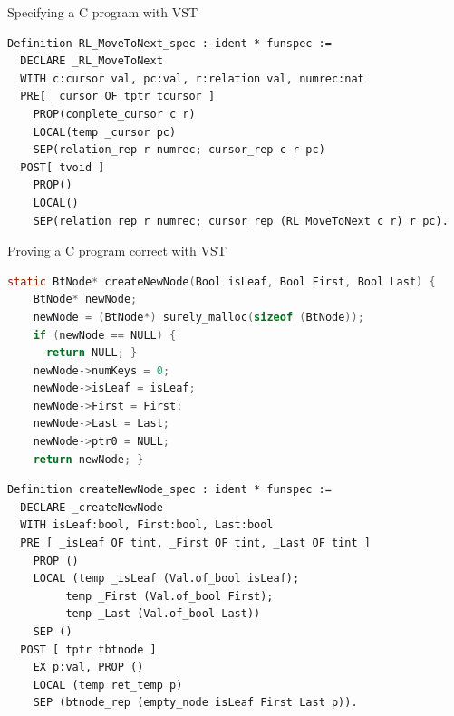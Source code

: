 \documentclass[page number,usenames,dvipsnames]{beamer}
\def\spec#1{{\color{spec}\textbf{#1}}}
\def\prog#1{{\color{prog}\textbf{#1}}}
\begin{document}
\begin{frame}[fragile]{Specifying a C program with VST}
 \begin{lstlisting}[language=Coq,basicstyle=\small]
Definition RL_MoveToNext_spec : ident * funspec :=
  DECLARE _RL_MoveToNext
  WITH c:cursor val, pc:val, r:relation val, numrec:nat
  PRE[ _cursor OF tptr tcursor ]
    PROP(complete_cursor c r)
    LOCAL(temp _cursor pc)
    SEP(relation_rep r numrec; cursor_rep c r pc)
  POST[ tvoid ]
    PROP()
    LOCAL()
    SEP(relation_rep r numrec; cursor_rep (RL_MoveToNext c r) r pc).
 \end{lstlisting}
 \vfill
 \begin{center}
 \end{center}
\end{frame}


\begin{frame}[fragile]{Proving a C program correct with VST}
  \begin{lstlisting}[language=C, basicstyle=\scriptsize]
static BtNode* createNewNode(Bool isLeaf, Bool First, Bool Last) {
    BtNode* newNode;
    newNode = (BtNode*) surely_malloc(sizeof (BtNode));
    if (newNode == NULL) {
      return NULL; }
    newNode->numKeys = 0;
    newNode->isLeaf = isLeaf;
    newNode->First = First;
    newNode->Last = Last;
    newNode->ptr0 = NULL;
    return newNode; }
  \end{lstlisting}
  \begin{lstlisting}[language=Coq, basicstyle=\tiny]
Definition createNewNode_spec : ident * funspec :=
  DECLARE _createNewNode
  WITH isLeaf:bool, First:bool, Last:bool
  PRE [ _isLeaf OF tint, _First OF tint, _Last OF tint ]
    PROP ()
    LOCAL (temp _isLeaf (Val.of_bool isLeaf);
         temp _First (Val.of_bool First);
         temp _Last (Val.of_bool Last))
    SEP ()
  POST [ tptr tbtnode ]
    EX p:val, PROP ()
    LOCAL (temp ret_temp p)
    SEP (btnode_rep (empty_node isLeaf First Last p)).
  \end{lstlisting}

\end{frame}
\end{document}
